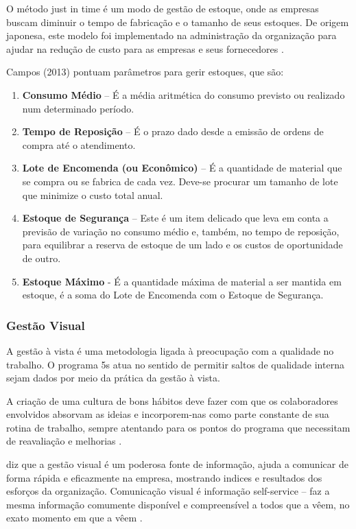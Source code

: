 O método just in time é um modo de gestão de estoque, onde as empresas buscam diminuir o tempo de fabricação e o tamanho de seus estoques. De origem japonesa, este modelo foi implementado na administração da organização para ajudar na redução de custo para as empresas e seus fornecedores \cite{MAXIMIANO2005}.

Campos (2013) pontuam parâmetros para gerir estoques, que são:
\begin{enumerate}[label=\alph*)]
\item \textbf{Consumo Médio} – É a média aritmética do consumo previsto ou realizado num determinado período.
\item \textbf{Tempo de Reposição} – É o prazo dado desde a emissão de ordens de compra até o atendimento.
\item \textbf{Lote de Encomenda (ou Econômico)} – É a quantidade de material que se compra ou se fabrica de cada vez. Deve-se procurar um tamanho de lote que minimize o custo total anual.
\item \textbf{Estoque de Segurança} – Este é um item delicado que leva em conta a previsão de variação no consumo médio e, também, no tempo de reposição, para equilibrar a reserva de estoque de um lado e os custos de oportunidade de outro.
\item \textbf{Estoque Máximo} - É a quantidade máxima de material a ser mantida em estoque, é a soma do Lote de Encomenda com o Estoque de Segurança. 
\end{enumerate}


\subsubsection{Gestão Visual}
\label{subsubsection:gestaoVisual}

A gestão à vista é uma metodologia ligada à preocupação com a qualidade no trabalho. O programa 5s atua no sentido de permitir saltos de qualidade interna sejam dados por meio da prática da gestão à vista. 

A criação de uma cultura de bons hábitos deve fazer com que os colaboradores envolvidos absorvam as ideias e incorporem-nas como parte constante de sua rotina de trabalho, sempre atentando para os pontos do programa que necessitam de reavaliação e melhorias \cite{ABRANTES2001}. 

 diz que a gestão visual é um poderosa fonte de informação, ajuda a comunicar de forma rápida e eficazmente na empresa, mostrando indices e resultados dos esforços da organização. Comunicação visual é informação self-service – faz a mesma informação comumente disponível e compreensível a todos que a vêem, no exato momento em que a vêem \cite{GREIF1989}. 

